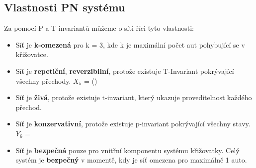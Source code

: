 \newpage
\subsection*{Vlastnosti PN systému}
\label{subsec:pn_properties}

Za pomocí P a T invariantů můžeme o síti říci tyto vlastnosti:

\begin{itemize}
    \item Síť je \textbf{k-omezená} pro k = 3, kde k je maximální počet aut pohybující se v křižovatce.
    \item Síť je \textbf{repetiční}, \textbf{reverzibilní}, protože existuje T-Invariant pokrývající všechny přechody. $X_5$ = (\tAll)
    \item Síť je \textbf{živá}, protože existuje t-invariant, který ukazuje proveditelnost každého přechod.
    \item Síť je \textbf{ konzervativní}, protože existuje p-invariant pokrývající všechny stavy. $Y_6$ = \orderArrayNumbered{\pAll}
    \item {
        Síť je \textbf{bezpečná} pouze pro vnitřní komponentu systému křižovatky.
        Celý systém je \textbf{bezpečný} v momentě, kdy je síť omezena pro maximálně 1 auto.
    }
\end{itemize}

\endinput
